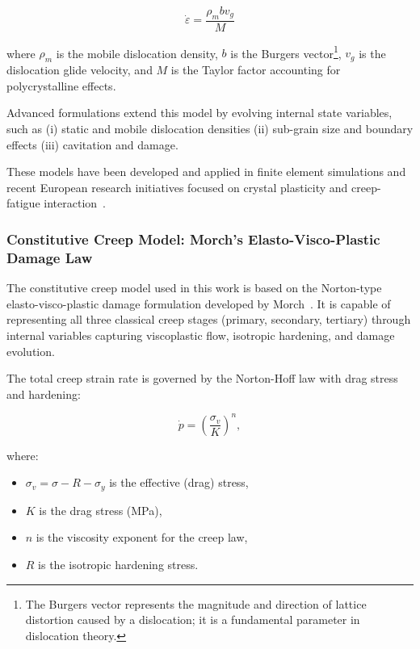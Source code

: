 \documentclass[class=scrbook, crop=false]{standalone}
\begin{document}
\begin{itemize}
	\begin{equation}
		\dot{\varepsilon} = \frac{\rho_m b v_g}{M}
	\end{equation}
	
	where \( \rho_m \) is the mobile dislocation density, \( b \) is the Burgers vector\footnote{The Burgers vector represents the magnitude and direction of lattice distortion caused by a dislocation; it is a fundamental parameter in dislocation theory.}, \( v_g \) is the dislocation glide velocity, and \( M \) is the Taylor factor accounting for polycrystalline effects.
	
	Advanced formulations extend this model by evolving internal state variables, such as (i) static and mobile dislocation densities (ii) sub-grain size and boundary effects (iii) cavitation and damage.
	
	These models have been developed and applied in finite element simulations and recent European research initiatives focused on crystal plasticity and creep-fatigue interaction~\cite{morch2022creep}.
	
\end{itemize}

\subsubsection*{Constitutive Creep Model: Morch’s Elasto-Visco-Plastic Damage Law}
\label{Subsubsection::Morch_Model_Definition}

The constitutive creep model used in this work is based on the Norton-type elasto-visco-plastic damage formulation developed by Morch~\cite{morch2022creep}. It is capable of representing all three classical creep stages (primary, secondary, tertiary) through internal variables capturing viscoplastic flow, isotropic hardening, and damage evolution.

The total creep strain rate is governed by the Norton-Hoff law with drag stress and hardening:

\begin{equation}
	\dot{p} = \left(\frac{\sigma_v}{K}\right)^n,
\end{equation}

where:
\begin{itemize}
	\item $\sigma_v = \sigma - R - \sigma_y$ is the effective (drag) stress,
	\item $K$ is the drag stress (MPa),
	\item $n$ is the viscosity exponent for the creep law,
	\item $R$ is the isotropic hardening stress.
\end{itemize}
\end{document}
